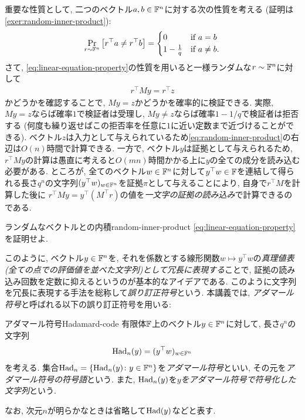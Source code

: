 重要な性質として, 二つのベクトル$a,b\in\mathbb{F}^n$に対する次の性質を考える (証明は\cref{exer:random-inner-product}):
\begin{align}
  \Pr_{r\sim \mathbb{F}^n} \qty[ r^\top a \ne r^\top b ] = \begin{cases}
    0 & \text{if } a=b \\
    1-\frac{1}{q} & \text{if } a\ne b.
  \end{cases} \label{eq:linear-equation-property}
\end{align}
さて, \cref{eq:linear-equation-property}の性質を用いると一様ランダムな$r\sim\mathbb{F}^n$に対して
\begin{align}
  r^\top M y = r^\top z \label{eq:random-inner-product}
\end{align}
かどうかを確認することで, $My=z$かどうかを確率的に検証できる.
実際, $My=z$ならば確率$1$で検証者は受理し,
$My\ne z$ならば確率$1-1/q$で検証者は拒否する (何度も繰り返せばこの拒否率を任意に$1$に近い定数まで近づけることができる).
ベクトル$z$は入力として与えられているため\cref{eq:random-inner-product}の右辺は$O(n)$時間で計算できる.
一方で, ベクトル$y$は証拠として与えられるため, $r^\top M y$の計算は愚直に考えると$O(mn)$時間かかる上に$y$の全ての成分を読み込む必要がある.
ところが, 全てのベクトル$w\in \mathbb{F}^n$に対して$y^\top w\in\mathbb{F}$を連結して得られる長さ$q^n$の文字列$(y^\top w)_{w\in \mathbb{F}^n}$を証拠$\pi$として与えることにより,
自身で$r^\top M$を計算した後に $r^\top M y = y^\top (M^\top r)$の値を\emph{一文字の証拠の読み込み}で計算できるのである.

\begin{exercise}{ランダムなベクトルとの内積}{random-inner-product}
  \cref{eq:linear-equation-property}を証明せよ.
\end{exercise}

このように, ベクトル$y\in\mathbb{F}^n$を, それを係数とする線形関数$w\mapsto y^\top w$の\emph{真理値表(全ての点での評価値を並べた文字列)として冗長に表現する}ことで, 証拠の読み込み回数を定数に抑えるというのが基本的なアイデアである.
このように文字列を冗長に表現する手法を総称して\emph{誤り訂正符号}という.
本講義では, \emph{アダマール符号}と呼ばれる以下の誤り訂正符号を用いる:
\begin{definition}{アダマール符号}{Hadamard-code}
  有限体$\mathbb{F}$上のベクトル$y\in\mathbb{F}^n$に対して, 長さ$q^n$の文字列
  \begin{align*}
    \mathrm{Had}_n(y) = (y^\top w)_{w\in \mathbb{F}^n}
  \end{align*}
  を考える.
  集合$\mathrm{Had}_n = \qty{ \mathrm{Had}_n(y) \colon y\in \mathbb{F}^n }$を\emph{アダマール符号}といい,
  その元を\emph{アダマール符号の符号語}という.
  また, $\mathrm{Had}_n(y)$を\emph{$y$をアダマール符号で符号化した文字列}という.

  なお, 次元$n$が明らかなときは省略して$\mathrm{Had}(y)$などと表す.
\end{definition}

